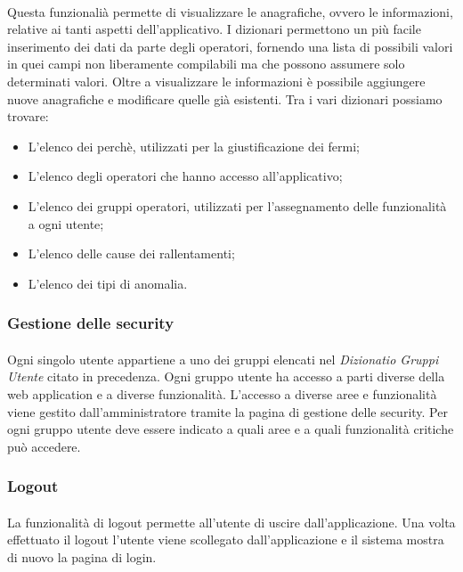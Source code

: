   \paragraph{}
  Questa funzionalià permette di visualizzare le anagrafiche, ovvero le informazioni, relative ai 
  tanti aspetti dell’applicativo. I dizionari permettono un più facile inserimento dei dati da parte 
  degli operatori, fornendo una lista di possibili valori in quei campi non liberamente compilabili ma 
  che possono assumere solo determinati valori. Oltre a visualizzare le informazioni è possibile aggiungere 
  nuove anagrafiche e modificare quelle già esistenti. Tra i vari dizionari possiamo trovare:
  \begin{itemize}
    \item L'elenco dei perchè, utilizzati per la giustificazione dei fermi;
    \item L'elenco degli operatori che hanno accesso all'applicativo;
    \item L'elenco dei gruppi operatori, utilizzati per l'assegnamento delle funzionalità a ogni utente;
    \item L'elenco delle cause dei rallentamenti;
    \item L'elenco dei tipi di anomalia.
  \end{itemize} 



  \subsubsection{Gestione delle security}
  \paragraph{}
  Ogni singolo utente appartiene a uno dei gruppi elencati nel \textit{Dizionatio Gruppi Utente} citato in precedenza. 
  Ogni gruppo utente ha accesso a parti diverse della web application e a diverse funzionalità. L'accesso a diverse aree e 
  funzionalità viene gestito dall'amministratore tramite la pagina di gestione delle security. Per ogni gruppo utente 
  deve essere indicato a quali aree e a quali funzionalità critiche può accedere.



  \subsubsection{Logout}
  \paragraph{}
  La funzionalità di logout permette all’utente di uscire dall’applicazione. Una volta effettuato il 
  logout l’utente viene scollegato dall’applicazione e il sistema mostra di nuovo la pagina di login.



